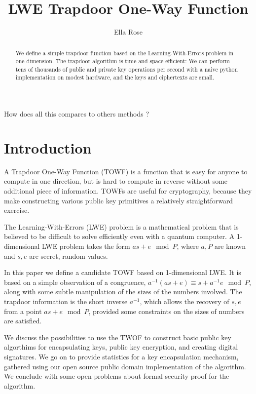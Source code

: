 \documentclass[preprint]{iacrtrans}
\author{Ella Rose}
\institute{Paso Robles, CA \email{python_pride@protonmail.com}}
\title[LWE Trapdoor One-Way Function]{LWE Trapdoor One-Way Function}
\begin{document}
\maketitle


\begin{abstract}
 We define a simple trapdoor function based on the Learning-With-Errors problem in one dimension. The trapdoor algorithm is time and space efficient: We can perform tens of thousands of public and private key operations per second with a naive python implementation on modest hardware, and the keys and ciphertexts are small.
 \end{abstract}

\todototoc
\listoftodos

How does all this compares to others methods ?

\section{Introduction}
A Trapdoor One-Way Function (TOWF) is a function that is easy for anyone to compute in one direction, but is hard to compute in reverse without some additional piece of information. TOWFs are useful for cryptography, because they make constructing various public key primitives a relatively straightforward exercise.

The Learning-With-Errors (LWE) problem is a mathematical problem that is believed to be difficult to solve efficiently even with a quantum computer. A 1-dimensional LWE problem takes the form $a s + e \mod P$, where $a, P$ are known and $s, e$ are secret, random values.

In this paper we define a candidate TOWF based on 1-dimensional LWE. It is based on a simple observation of a congruence, $a^{-1}(a s + e) \equiv s + a^{-1} e \mod P$, along with some subtle manipulation of the sizes of the numbers involved. The trapdoor information is the short inverse $a^{-1}$, which allows the recovery of $s, e$ from a point $a s + e \mod P$, provided some constraints on the sizes of numbers are satisfied.

We discuss the possibilities to use the TWOF to construct basic public key algorthims for encapsulating keys, public key encryption, and creating digital signatures. We go on to provide statistics for a key encapsulation mechanism, gathered using our open source public domain implementation of the algorithm. We conclude with some open problems about formal security proof for the algorithm.
\end{document}

